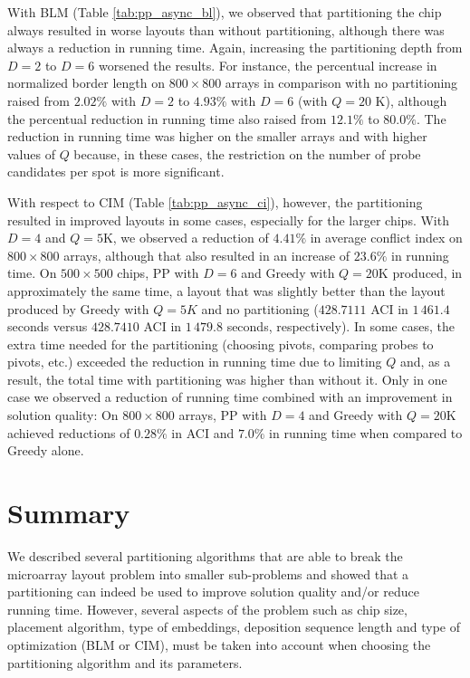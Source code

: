With BLM (Table \ref{tab:pp_async_bl}), we observed that partitioning the chip
always resulted in worse layouts than without partitioning, although there was
always a reduction in running time. Again, increasing the partitioning depth
from $D=2$ to $D=6$ worsened the results. For instance, the percentual increase
in normalized border length on $800\times 800$ arrays in comparison with no
partitioning raised from $2.02\%$ with $D=2$ to $4.93\%$ with $D=6$ (with $Q=20$
K), although the percentual reduction in running time also raised from $12.1\%$
to $80.0\%$. The reduction in running time was higher on the smaller arrays and
with higher values of $Q$ because, in these cases, the restriction on the number
of probe candidates per spot is more significant.

With respect to CIM (Table \ref{tab:pp_async_ci}), however, the partitioning
resulted in improved layouts in some cases, especially for the larger chips.
With $D=4$ and $Q=5$K, we observed a reduction of $4.41\%$ in average conflict
index on $800\times 800$ arrays, although that also resulted in an increase of
$23.6\%$ in running time. On $500\times 500$ chips, PP with $D=6$ and Greedy
with $Q=20$K produced, in approximately the same time, a layout that was
slightly better than the layout produced by Greedy with $Q=5K$ and no
partitioning ($428.7111$ ACI in $1\,461.4$ seconds versus $428.7410$ ACI in
$1\,479.8$ seconds, respectively). In some cases, the extra time needed for the
partitioning (choosing pivots, comparing probes to pivots, etc.) exceeded the
reduction in running time due to limiting $Q$ and, as a result, the total time
with partitioning was higher than without it. Only in one case we observed a
reduction of running time combined with an improvement in solution quality: On
$800\times 800$ arrays, PP with $D=4$ and Greedy with $Q=20$K achieved
reductions of $0.28\%$ in ACI and $7.0\%$ in running time when compared to
Greedy alone.

\section{Summary}
\label{sec:part_summary}

We described several partitioning algorithms that are able to break the
microarray layout problem into smaller sub-problems and showed that a
partitioning can indeed be used to improve solution quality and/or reduce
running time. However, several aspects of the problem such as chip size,
placement algorithm, type of embeddings, deposition sequence length and type of
optimization (BLM or CIM), must be taken into account when choosing the
partitioning algorithm and its parameters.

